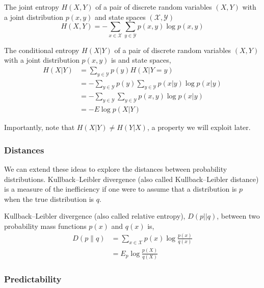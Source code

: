 \begin{definition}
	The joint entropy $H(X,Y)$ of a pair of discrete random variables $(X,Y)$ with a joint distribution $p(x,y)$ and state spaces $(\mathcal{X}, \mathcal{Y})$
	\begin{equation}
	H(X, Y)=-\sum_{x \in \mathcal{X}} \sum_{y \in \mathcal{Y}} p(x, y) \log p(x, y)
	\end{equation}
\end{definition}


\begin{definition}
	The conditional entropy $H(X|Y)$ of a pair of discrete random variables $(X,Y)$ with a joint distribution $p(x,y)$ is and state spaces, 
		\begin{align}
		H(X | Y)&=\sum_{y \in \mathcal{Y}} p(y) H(X |Y=y) \\
		&=-\sum_{y \in \mathcal{Y}} p(y) \sum_{y \in \mathcal{Y}} p(x | y) \log p(x | y) \\ 
		&=-\sum_{y \in \mathcal{Y}} \sum_{y \in \mathcal{Y}} p(x, y) \log p(x | y) \\ 
		&=-E \log p(X | Y)
		\end{align}
\end{definition}

\begin{remark}
	Importantly, note that $H(X|Y) \neq  H(Y|X)$, a property we will exploit later.
\end{remark}

\subsubsection{Distances}
We can extend these ideas to explore the distances between probability distributions. Kullback–Leibler divergence (also called Kullback–Leibler distance) is a measure of the inefficiency if one were to assume that a distribution is $p$ when the true distribution is $q$.

\begin{definition}
	Kullback–Leibler divergence (also called relative entropy), $D(p||q)$,  between two probability mass functions $p(x)$ and $q(x)$ is,
	\begin{align} 
		D(p \| q) &=\sum_{x \in \mathcal{X}} p(x) \log \frac{p(x)}{q(x)} \\ 
					 &=E_{p} \log \frac{p(X)}{q(X)} 
	\end{align}
	
\end{definition}

\subsubsection{Predictability}
